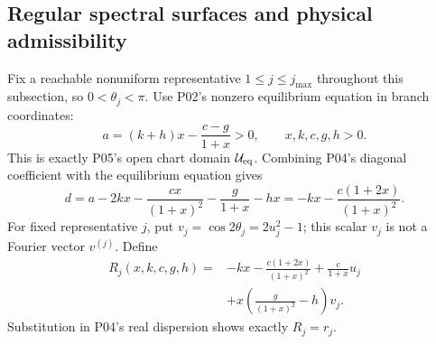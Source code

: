 \subsection{Regular spectral surfaces and physical admissibility}
Fix a reachable nonuniform representative $1\le j\le j_{\max}$
throughout this subsection, so $0<\theta_j<\pi$.
Use P02's nonzero equilibrium equation in branch coordinates:
\begin{equation}
 a=(k+h)x-\frac{c-g}{1+x}>0,\qquad x,k,c,g,h>0.
 \label{eq:P11-chart}
\end{equation}
This is exactly P05's open chart domain $\mathcal U_{\rm eq}$.
Combining P04's diagonal coefficient with the equilibrium equation gives
\[
 d=a-2kx-\frac{cx}{(1+x)^2}-\frac g{1+x}-hx
   =-kx-\frac{c(1+2x)}{(1+x)^2}.
\]
For fixed representative $j$, put $v_j=\cos2\theta_j=2u_j^2-1$;
this scalar $v_j$ is not a Fourier vector $v^{(j)}$. Define
\begin{equation}
 \begin{split}
 R_j(x,k,c,g,h)={}&-kx-\frac{c(1+2x)}{(1+x)^2}
                 +\frac{c}{1+x}u_j\\
                &+x\left(\frac{g}{(1+x)^2}-h\right)v_j.
 \end{split}
 \label{eq:P11-R}
\end{equation}
Substitution in P04's real dispersion shows exactly $R_j=r_j$.


